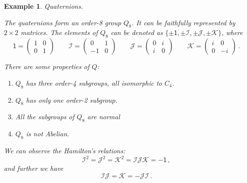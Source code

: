 \documentclass{article}
\theoremstyle{plain}\theoremheaderfont{\normalfont\itshape}\theorembodyfont{\rmfamily}\theoremseparator{.}\newtheorem*{rem}{Remark}\newtheorem*{ex}{Example}\newtheorem*{proof}{Proof}\newtheorem*{altp}{Alternative proof}
\theoremstyle{plain}\theoremheaderfont{\normalfont\bfseries}\theorembodyfont{\rmfamily}\theoremseparator{.}\newtheorem{thm}{Theorem}[section]\newtheorem{lem}[thm]{Lemma}\newtheorem{prop}[thm]{Proposition}\newtheorem*{cor}{Corollary}\newtheorem{defn}[thm]{Definition}\newtheorem{clm}[thm]{Claim}\newtheorem{clminproof}{Claim}
\theoremstyle{break}\theoremheaderfont{\normalfont\itshape}\theorembodyfont{\rmfamily}\theoremseparator{.\medskip}\newtheorem*{proofskip}{Proof}\newtheorem*{exs}{Examples}\newtheorem*{rems}{Remarks}
\theoremstyle{break}\theoremheaderfont{\normalfont\bfseries}\theorembodyfont{\rmfamily}\theoremseparator{.\medskip}\newtheorem{lemskip}[thm]{Lemma}\newtheorem{defnskip}[thm]{Definition}\newtheorem{propskip}[thm]{Proposition}\newtheorem{thmskip}[thm]{Theorem}
\numberwithin{equation}{section}
\begin{document}
	\begin{ex}
		\textit{Quaternions.}

		The quaternions form an order-8 group \(Q_8\). It can be faithfully represented by \(2\times 2\) matrices. The elements of \(Q_8\) can be denoted as \(\{\pm \mathsf{1},\pm\mathcal{I},\pm\mathcal{J},\pm\mathcal{K}\}\), where
		\[\mathsf{1}=\begin{pmatrix}
			1 & 0\\
			0 & 1
		\end{pmatrix}\qquad\mathcal{I}=\begin{pmatrix}
			0 & 1\\
			-1 & 0
		\end{pmatrix}\qquad\mathcal{J}=\begin{pmatrix}
			0 & i\\
			i & 0
		\end{pmatrix}\qquad\mathcal{K}=\begin{pmatrix}
			i & 0\\
			0 & -i
		\end{pmatrix}\,.\]

		There are some properties of \(Q\):
		\begin{enumerate}[topsep=0pt]
			\item \(Q_8\) has three order-4 subgroups, all isomorphic to \(C_4\).
			\item \(Q_8\) has only one order-2 subgroup.
			\item All the subgroups of \(Q_8\) are normal
			\item \(Q_8\) is not Abelian.
		\end{enumerate}

		We can observe the \textit{Hamilton's relations}:
		\[\mathcal{I}^2=\mathcal{J}^2=\mathcal{K}^2=\mathcal{IJK}=-\mathsf{1}\,,\]
		and further we have
		\[\mathcal{IJ}=\mathcal{K}=-\mathcal{JI}\,.\]
	\end{ex}
\end{document}
